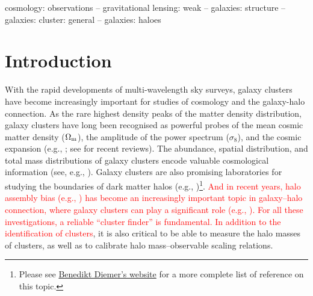\documentclass[fleqn,usenatbib,useAMS]{mnras}
\begin{document}
\begin{keywords}
    cosmology: observations --
    gravitational lensing: weak --
    galaxies: structure --
    galaxies: cluster: general --
    galaxies: haloes
\end{keywords}



\section{Introduction}
    \label{sec:intro}
    
    With the rapid developments of multi-wavelength sky surveys, galaxy clusters have become
    increasingly important for studies of cosmology and the galaxy-halo connection.
    As the rare highest density peaks of the matter density distribution, galaxy clusters have long
    been recognised as powerful probes of the mean cosmic matter density ($\Omega_{\rm m}$), the
    amplitude of the power spectrum ($\sigma_{8}$), and the cosmic expansion (e.g.,
    \citealt{Evrard1989, Peebles1989, White1993, Viana1996, Wang1998, Wagoner2021}; see
    \citealt{Allen2011, Kravtsov2012, Weinberg2013} for recent reviews).
    The abundance, spatial distribution, and total mass distributions of galaxy clusters encode
    valuable cosmological information (see, e.g., \citealt{Haiman2001, Holder2001, Vikhlinin2009b,
    Rozo2010, Benson2013, Mantz2014, Bocquet2019, Abbott2020, To2021a, To2021b, Wu2021}). 
    Galaxy clusters are also promising laboratories for studying the boundaries of dark matter halos
    (e.g., \citealt{Diemer2014, More2015b, More2016, Chang2018, Shin2019, Zurcher2019, Tomooka2020,
    Xhakaj2020})\footnote{Please see
    \href{http://www.benediktdiemer.com/research/splashback/}{Benedikt Diemer's website} for a more
    complete list of reference on this topic.}.
    \textcolor{red}{
    And in recent years, halo assembly bias (e.g., \citealt{ShethTormen2004, Gao2005}) has become 
    an increasingly important topic in galaxy--halo connection, where galaxy clusters can 
    play a significant role (e.g., \citealt{Tinker2012, Miyatake2016, Zu2017}).
    For all these investigations, a reliable ``cluster finder'' is fundamental. 
    }
    \textcolor{red}{In addition to the identification of clusters}, it is also critical to be able to measure the 
    halo masses of clusters, as well as to calibrate halo mass--observable scaling relations.
\end{document}
